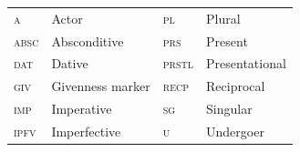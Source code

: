 \documentclass[output=collectionpaper]{langsci/langscibook}
\begin{document}
\begin{tabular}{llll}
\textsc{a} &Actor& \textsc{pl} & Plural \\
\textsc{absc} & Absconditive& \textsc{prs} & Present \\
\textsc{dat}  &Dative& \textsc{prstl} & Presentational \\
\textsc{giv} & Givenness marker& \textsc{recp} & Reciprocal \\
\textsc{imp} & Imperative& \textsc{sg} & Singular \\
\textsc{ipfv} & Imperfective& \textsc{u} & Undergoer \\
\end{tabular}








\printbibliography[heading=subbibliography,notkeyword=this]

\label{lastpage:Olsson}
\end{document}
